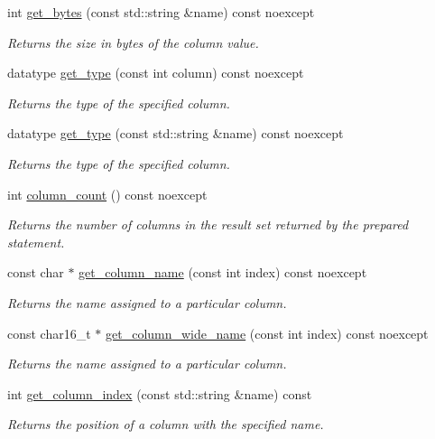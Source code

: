 \begin{DoxyCompactItemize}
int \hyperlink{a00010_a315b97406b5ba48bcd14857192d88d5e}{get\-\_\-bytes} (const std\-::string \&name) const noexcept
\begin{DoxyCompactList}\small\item\em Returns the size in bytes of the column value. \end{DoxyCompactList}\item 
datatype \hyperlink{a00010_a2b8269e0f9387afa36ab90eb55899dc4}{get\-\_\-type} (const int column) const noexcept
\begin{DoxyCompactList}\small\item\em Returns the type of the specified column. \end{DoxyCompactList}\item 
datatype \hyperlink{a00010_ac5ab606cf12aa4d2c9a183998420df44}{get\-\_\-type} (const std\-::string \&name) const noexcept
\begin{DoxyCompactList}\small\item\em Returns the type of the specified column. \end{DoxyCompactList}\item 
int \hyperlink{a00010_a7390afddbb1edc788f0afc6ce41f4562}{column\-\_\-count} () const noexcept
\begin{DoxyCompactList}\small\item\em Returns the number of columns in the result set returned by the prepared statement. \end{DoxyCompactList}\item 
const char $\ast$ \hyperlink{a00010_ad4c33f9b700a47c08f54e7b65afd34f2}{get\-\_\-column\-\_\-name} (const int index) const noexcept
\begin{DoxyCompactList}\small\item\em Returns the name assigned to a particular column. \end{DoxyCompactList}\item 
const char16\-\_\-t $\ast$ \hyperlink{a00010_aa7f2f528b10da75672e55fbc36566f9c}{get\-\_\-column\-\_\-wide\-\_\-name} (const int index) const noexcept
\begin{DoxyCompactList}\small\item\em Returns the name assigned to a particular column. \end{DoxyCompactList}\item 
int \hyperlink{a00010_aaca43590a209c2c7a0f7420c8a6c47b3}{get\-\_\-column\-\_\-index} (const std\-::string \&name) const
\begin{DoxyCompactList}\small\item\em Returns the position of a column with the specified name. \end{DoxyCompactList}\end{DoxyCompactItemize}


